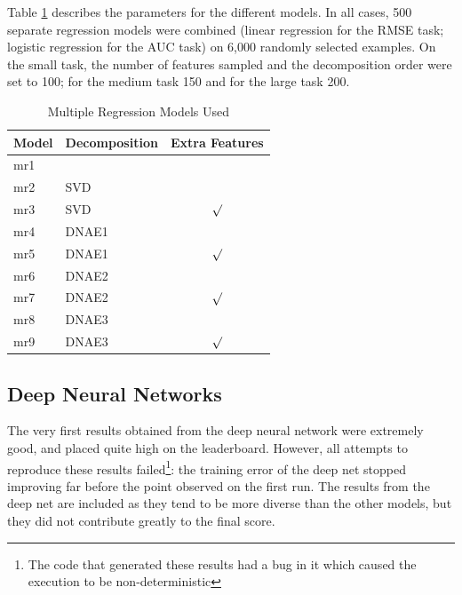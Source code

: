 \documentclass{article}
\begin{document}
Table \ref{table:multiple-regression-models} describes the parameters for the different models.  In all cases, 500 separate regression models were combined (linear regression for the RMSE task; logistic regression for the AUC task) on 6,000 randomly selected examples.  On the small task, the number of features sampled and the decomposition order were set to 100; for the medium task 150 and for the large task 200.

\begin{table}
\caption{Multiple Regression Models Used}
\label{table:multiple-regression-models}
\vskip 0.15in
\begin{center}
\begin{small}
\begin{sc}
\begin{tabular}{llc}
\hline
\abovespace\belowspace
Model & Decomposition & Extra Features \\
\hline
\abovespace
mr1   &        &         \\
mr2   & SVD    &         \\
mr3   & SVD    & $\surd$ \\
mr4   & DNAE1  &         \\
mr5   & DNAE1  & $\surd$ \\
mr6   & DNAE2  &         \\
mr7   & DNAE2  & $\surd$ \\
mr8   & DNAE3  &         \\
\belowspace
mr9   & DNAE3  & $\surd$ \\
\hline
\end{tabular}
\end{sc}
\end{small}
\end{center}
\vskip -0.1in
\end{table}


\subsection{Deep Neural Networks}

The very first results obtained from the deep neural network were extremely good, and placed quite high on the leaderboard.  However, all attempts to reproduce these results failed\footnote{The code that generated these results had a bug in it which caused the execution to be non-deterministic}: the training error of the deep net stopped improving far before the point observed on the first run.  The results from the deep net are included as they tend to be more diverse than the other models, but they did not contribute greatly to the final score.
\end{document}
